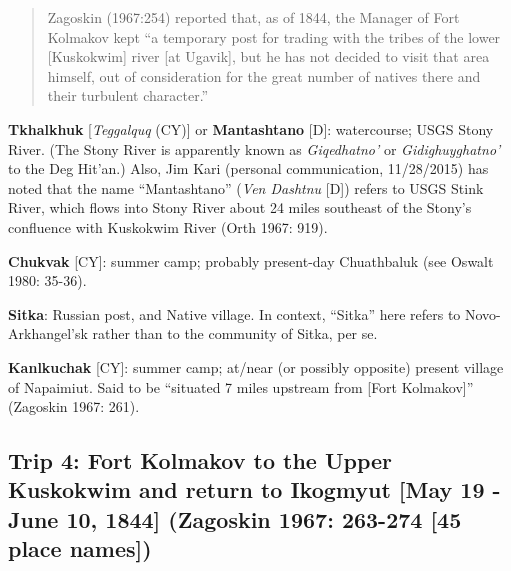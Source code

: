 \begin{hang}
\begin{quote}Zagoskin (1967:254) reported that, as of 1844, the Manager of Fort Kolmakov kept “a temporary post for trading with the tribes of the lower [Kuskokwim] river [at Ugavik], but he has not decided to visit that area himself, out of consideration for the great number of natives there and their turbulent character.”
\end{quote}



\textbf{Tkhalkhuk} [\textit{Teggalquq} (CY)] or \textbf{Mantashtano} [D]: watercourse; USGS Stony River. (The Stony River is apparently known as \textit{Giqedhatno’} or \textit{Gidighuyghatno’} to\textit{ }the Deg Hit’an.) Also, Jim Kari (personal communication, 11/28/2015) has noted that the name “Mantashtano” (\textit{Ven Dashtnu} [D]) refers to USGS Stink River, which flows into Stony River about 24 miles southeast of the Stony’s confluence with Kuskokwim River (Orth 1967: 919).



\textbf{Chukvak} [CY]: summer camp; probably present-day Chuathbaluk (see Oswalt 1980: 35-36).



\textbf{Sitka}: Russian post, and Native village. In context, “Sitka” here refers to Novo-Arkhangel’sk rather than to the community of Sitka, per se.



\textbf{Kanlkuchak} [CY]: summer camp; at/near (or possibly opposite) present village of Napaimiut. Said to be “situated 7 miles upstream from [Fort Kolmakov]” (Zagoskin 1967: 261).

\end{hang}


\subsection*{Trip 4: Fort Kolmakov to the Upper Kuskokwim and return to Ikogmyut [May 19 - June 10, 1844] (Zagoskin 1967: 263-274 [45 place names])}
\ \\
\ \\


